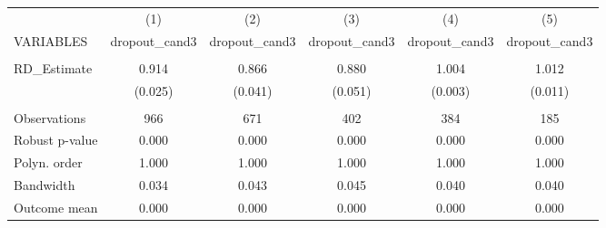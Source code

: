 \documentclass[]{article}
\begin{document}
\begin{tabular}{lccccc} \hline
 & (1) & (2) & (3) & (4) & (5) \\
VARIABLES & dropout\_cand3 & dropout\_cand3 & dropout\_cand3 & dropout\_cand3 & dropout\_cand3 \\ \hline
 &  &  &  &  &  \\
RD\_Estimate & 0.914 & 0.866 & 0.880 & 1.004 & 1.012 \\
 & (0.025) & (0.041) & (0.051) & (0.003) & (0.011) \\
 &  &  &  &  &  \\
Observations & 966 & 671 & 402 & 384 & 185 \\
Robust p-value & 0.000 & 0.000 & 0.000 & 0.000 & 0.000 \\
Polyn. order & 1.000 & 1.000 & 1.000 & 1.000 & 1.000 \\
Bandwidth & 0.034 & 0.043 & 0.045 & 0.040 & 0.040 \\
 Outcome mean & 0.000 & 0.000 & 0.000 & 0.000 & 0.000 \\ \hline
\end{tabular}
\end{document}
